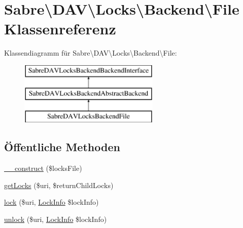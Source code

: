 \hypertarget{class_sabre_1_1_d_a_v_1_1_locks_1_1_backend_1_1_file}{}\section{Sabre\textbackslash{}D\+AV\textbackslash{}Locks\textbackslash{}Backend\textbackslash{}File Klassenreferenz}
\label{class_sabre_1_1_d_a_v_1_1_locks_1_1_backend_1_1_file}
Klassendiagramm für Sabre\textbackslash{}D\+AV\textbackslash{}Locks\textbackslash{}Backend\textbackslash{}File\+:\begin{figure}[H]
\begin{center}
\leavevmode
\includegraphics[height=3.000000cm]{class_sabre_1_1_d_a_v_1_1_locks_1_1_backend_1_1_file}
\end{center}
\end{figure}
\subsection*{Öffentliche Methoden}
\begin{DoxyCompactItemize}
\item 
\mbox{\hyperlink{class_sabre_1_1_d_a_v_1_1_locks_1_1_backend_1_1_file_a58ea633649bd7512258e012b7b930d6d}{\+\_\+\+\_\+construct}} (\$locks\+File)
\item 
\mbox{\hyperlink{class_sabre_1_1_d_a_v_1_1_locks_1_1_backend_1_1_file_ab7391e753024cdc97580456fddb9c186}{get\+Locks}} (\$uri, \$return\+Child\+Locks)
\item 
\mbox{\hyperlink{class_sabre_1_1_d_a_v_1_1_locks_1_1_backend_1_1_file_a4774f12783741b0a3df9017c8536991a}{lock}} (\$uri, \mbox{\hyperlink{class_sabre_1_1_d_a_v_1_1_locks_1_1_lock_info}{Lock\+Info}} \$lock\+Info)
\item 
\mbox{\hyperlink{class_sabre_1_1_d_a_v_1_1_locks_1_1_backend_1_1_file_a2429ba558b0d1c66140829072c512945}{unlock}} (\$uri, \mbox{\hyperlink{class_sabre_1_1_d_a_v_1_1_locks_1_1_lock_info}{Lock\+Info}} \$lock\+Info)
\end{DoxyCompactItemize}
